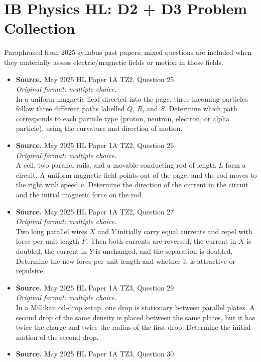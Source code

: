 \documentclass[11pt]{article}
\begin{document}
\section*{IB Physics HL: D2 + D3 Problem Collection}
Paraphrased from 2025-syllabus past papers; mixed questions are included when they materially assess electric/magnetic fields or motion in those fields.
\begin{itemize}[leftmargin=1.25em]
\item
\textbf{Source.} May 2025 HL Paper 1A TZ2, Question 25\\
\textit{Original format: multiple choice.}\\
In a uniform magnetic field directed into the page, three incoming particles follow three different paths labelled $Q$, $R$, and $S$. Determine which path corresponds to each particle type (proton, neutron, electron, or alpha particle), using the curvature and direction of motion.
\item
\textbf{Source.} May 2025 HL Paper 1A TZ2, Question 26\\
\textit{Original format: multiple choice.}\\
A cell, two parallel rails, and a movable conducting rod of length $L$ form a circuit. A uniform magnetic field points out of the page, and the rod moves to the right with speed $v$. Determine the direction of the current in the circuit and the initial magnetic force on the rod.
\item
\textbf{Source.} May 2025 HL Paper 1A TZ2, Question 27\\
\textit{Original format: multiple choice.}\\
Two long parallel wires $X$ and $Y$ initially carry equal currents and repel with force per unit length $F$. Then both currents are reversed, the current in $X$ is doubled, the current in $Y$ is unchanged, and the separation is doubled. Determine the new force per unit length and whether it is attractive or repulsive.
\item
\textbf{Source.} May 2025 HL Paper 1A TZ3, Question 29\\
\textit{Original format: multiple choice.}\\
In a Millikan oil-drop setup, one drop is stationary between parallel plates. A second drop of the same density is placed between the same plates, but it has twice the charge and twice the radius of the first drop. Determine the initial motion of the second drop.
\item
\textbf{Source.} May 2025 HL Paper 1A TZ3, Question 30\\

\end{itemize}
\end{document}
